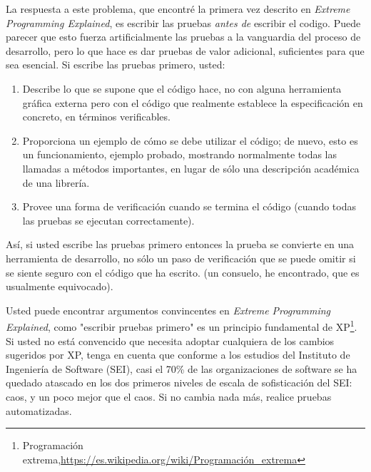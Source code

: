 
La respuesta a este problema, que encontré la primera vez descrito en \textit{Extreme Programming Explained}, es escribir las pruebas \textit{antes de} escribir el codigo. Puede parecer que esto fuerza artificialmente las pruebas a la vanguardia del proceso de desarrollo, pero lo que hace es dar pruebas de valor adicional, suficientes para que sea esencial. Si escribe las pruebas primero, usted:    \newline

\begin{enumerate}[1.]

    \item Describe lo que se supone que el código hace, no con alguna herramienta gráfica externa pero con el código que realmente establece la especificación en concreto, en términos verificables.
    
    \item Proporciona un ejemplo de cómo se debe utilizar el código; de nuevo, esto es un funcionamiento, ejemplo probado, mostrando normalmente todas las llamadas a métodos importantes, en lugar de sólo una descripción académica de una librería.
    
    \item Provee una forma de verificación cuando se termina el código (cuando todas las pruebas se ejecutan correctamente).
    
\end{enumerate}

Así, si usted escribe las pruebas primero entonces la prueba se convierte en una herramienta de desarrollo, no sólo un paso de verificación que se puede omitir si se siente seguro con el código que ha escrito. (un consuelo, he encontrado, que es usualmente equivocado).    \newline

Usted puede encontrar argumentos convincentes en \textit{Extreme Programming Explained}, como "escribir pruebas primero" es un principio fundamental de XP\footnote{Programación extrema,\url{https://es.wikipedia.org/wiki/Programación_extrema}}.
Si usted no está convencido que necesita adoptar cualquiera de los cambios sugeridos por XP, tenga en cuenta que conforme a los estudios del Instituto de Ingeniería de Software (SEI), 
casi el 70\% de las organizaciones de software se ha quedado atascado en los dos primeros niveles de escala de sofisticación del SEI: caos, y un poco mejor que el caos. Si no cambia nada más, realice pruebas automatizadas.

